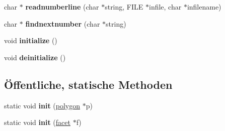\begin{DoxyCompactItemize}
\item 
\hypertarget{classtetgenio_a5e59fa66b5f0f4a7b7aa72df554ac1c7}{char $\ast$ {\bfseries readnumberline} (char $\ast$string, F\-I\-L\-E $\ast$infile, char $\ast$infilename)}\label{classtetgenio_a5e59fa66b5f0f4a7b7aa72df554ac1c7}

\item 
\hypertarget{classtetgenio_a9a30e99d63fb2288525cdbda2b887c38}{char $\ast$ {\bfseries findnextnumber} (char $\ast$string)}\label{classtetgenio_a9a30e99d63fb2288525cdbda2b887c38}

\item 
\hypertarget{classtetgenio_ac164a365a6a479bb31cd40443f5bd989}{void {\bfseries initialize} ()}\label{classtetgenio_ac164a365a6a479bb31cd40443f5bd989}

\item 
\hypertarget{classtetgenio_afcc5a8855570b36717070f3f47e3ef2a}{void {\bfseries deinitialize} ()}\label{classtetgenio_afcc5a8855570b36717070f3f47e3ef2a}

\end{DoxyCompactItemize}
\subsection*{Öffentliche, statische Methoden}
\begin{DoxyCompactItemize}
\item 
\hypertarget{classtetgenio_aca2fd0dcb29ee3cd313a74d55df2ff2c}{static void {\bfseries init} (\hyperlink{structtetgenio_1_1polygon}{polygon} $\ast$p)}\label{classtetgenio_aca2fd0dcb29ee3cd313a74d55df2ff2c}

\item 
\hypertarget{classtetgenio_a54b1b29c83d5c6e1466bbb087fe1f80e}{static void {\bfseries init} (\hyperlink{structtetgenio_1_1facet}{facet} $\ast$f)}\label{classtetgenio_a54b1b29c83d5c6e1466bbb087fe1f80e}

\end{DoxyCompactItemize}
